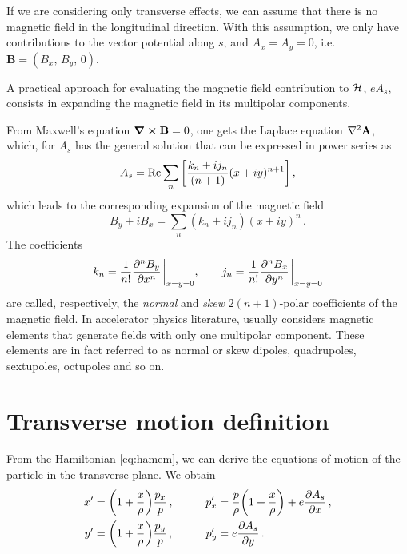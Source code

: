 If we are considering only transverse effects, we can assume that there is no magnetic field in the longitudinal direction. With this assumption, we only have contributions to the vector potential along $s$, and $A_x=A_y=0$, i.e.\ $\mathbf{B}=(B_x,\,B_y,\,0)$.

A practical approach for evaluating the magnetic field contribution to $\tilde{\mathcal{H}}$, $eA_s$, consists in expanding the magnetic field in its multipolar components.

From Maxwell's equation $\curl\mathbf{B}=0$, one gets the Laplace equation $\laplacian\mathbf{A}$, which, for $A_s$ has the general solution that can be expressed in power series as
%
\begin{equation}
	A_s = \Re\sum_{n}\qty[ \frac{k_n + ij_n}{(n+1)}(x+iy)^{n+1}]\, ,%
	\label{eq:as}
\end{equation}
%
which leads to the corresponding expansion of the magnetic field
\begin{equation}
	B_y + iB_x = \sum_n (k_n + ij_n) (x+iy)^n\,.
\end{equation}
%
The coefficients
\begin{equation}
	k_n = \frac{1}{n!} \pdv[n]{B_y}{x}\eval_{x=y=0}, \qquad 
	j_n = \frac{1}{n!} \pdv[n]{B_x}{y}\eval_{x=y=0} 
\end{equation}
%
are called, respectively, the \textit{normal} and \textit{skew} $2(n+1)$-polar coefficients of the magnetic field. In accelerator physics literature, usually considers magnetic elements that generate fields with only one multipolar component. These elements are in fact referred to as normal or skew dipoles, quadrupoles, sextupoles, octupoles and so on.

%
\section{Transverse motion definition}
%

From the Hamiltonian \eqref{eq:hamem}, we can derive the equations of motion of the particle in the transverse plane. We obtain
%
\begin{equation}
    \begin{aligned}
        x' &= \qty(1+\frac{x}{\rho})\frac{p_x}{p}\,, &\qquad p_x' &= \frac{p}{\rho}\qty(1+\frac{x}{\rho}) + e\pdv{A_s}{x}\,,\\ %
        y' &= \qty(1+\frac{x}{\rho})\frac{p_y}{p}\,, &\qquad p_y' &= e\pdv{A_s}{y}\,.
    \end{aligned}
    \label{eq:ham_motion}
\end{equation}


